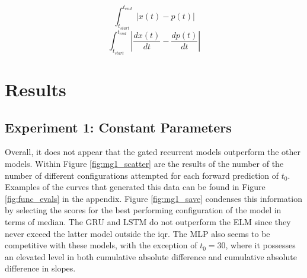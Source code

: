 \documentclass[11pt]{article}
\begin{document}
\begin{equation}
  \int_{t_{start}}^{t_{end}} | x(t) - p(t) |
\label{eq:cumabs}
\end{equation}
\begin{equation}
  \int_{t_{start}}^{t_{end}} | \frac{dx(t)}{dt} - \frac{dp(t)}{dt} |
\label{eq:cumabsderiv}
\end{equation}

\section {Results}
\subsection {Experiment 1: Constant Parameters}

Overall, it does not appear that the gated recurrent models outperform
the other
models. Within Figure \ref{fig:mg1_scatter} are the results of the
number of the number of different configurations attempted for each forward
prediction of $t_0$. Examples of the curves that generated this data
can be found in Figure \ref{fig:func_evals} in the appendix. Figure \ref{fig:mg1_save} condenses this information by selecting the scores for
the best performing configuration of the model in terms of
median. The GRU and LSTM do not
outperform the ELM since they never exceed the latter model outside
the iqr. The MLP also seems to be competitive with these models, with
the exception of $t_0 = 30$, where it possesses an elevated level in
both cumulative absolute difference and cumulative absolute difference
in slopes. 

\end{document}
